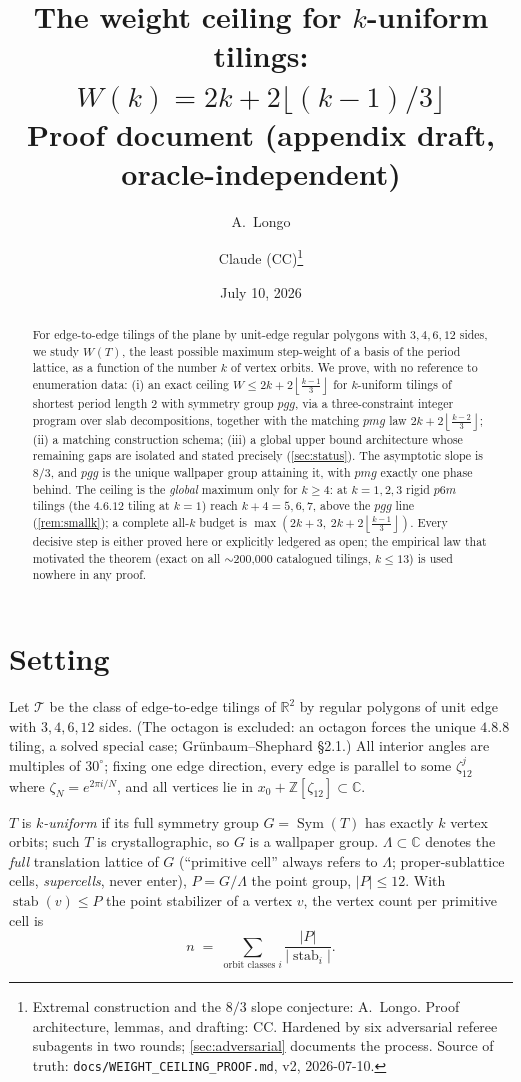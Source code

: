 \documentclass[11pt,a4paper,oneside]{article}
\title{The weight ceiling for $k$-uniform tilings:\\
$W(k) = 2k + 2\lfloor (k-1)/3\rfloor$\\[1ex]
\large Proof document (appendix draft, oracle-independent)}
\author{A.~Longo \and Claude (CC)\thanks{Extremal construction and the $8/3$ slope
conjecture: A.~Longo. Proof architecture, lemmas, and drafting: CC. Hardened by six
adversarial referee subagents in two rounds; \cref{sec:adversarial} documents the process.
Source of truth: \texttt{docs/WEIGHT\_CEILING\_PROOF.md}, v2, 2026-07-10.}}
\date{July 10, 2026}
\theoremstyle{plain}
\theoremstyle{definition}
\theoremstyle{remark}
\DeclareMathOperator{\stab}{stab}
\DeclareMathOperator{\Sym}{Sym}
\newcommand{\ZZ}{\mathbb{Z}}
\newcommand{\RR}{\mathbb{R}}
\newcommand{\CC}{\mathbb{C}}
\newcommand{\Tcl}{\mathcal{T}}
\newcommand{\zt}[1]{\zeta_{#1}}
\newcommand{\fl}[1]{\left\lfloor #1 \right\rfloor}
\newcommand{\ceilw}{2k + 2\fl{\tfrac{k-1}{3}}}
\newcommand{\pmgw}{2k + 2\fl{\tfrac{k-2}{3}}}
\begin{document}
\maketitle

\begin{abstract}
\noindent For edge-to-edge tilings of the plane by unit-edge regular polygons with
$3,4,6,12$ sides, we study $W(T)$, the least possible maximum step-weight of a basis of the
period lattice, as a function of the number $k$ of vertex orbits. We prove, with no
reference to enumeration data: (i) an exact ceiling $W \le \ceilw$ for $k$-uniform tilings
of shortest period length $2$ with symmetry group $pgg$, via a three-constraint integer
program over slab decompositions, together with the matching $pmg$ law $\pmgw$; (ii) a
matching construction schema; (iii) a global upper bound architecture whose remaining gaps
are isolated and stated precisely (\cref{sec:status}). The asymptotic slope is $8/3$, and
$pgg$ is the unique wallpaper group attaining it, with $pmg$ exactly one phase behind. The
ceiling is the \emph{global} maximum only for $k \ge 4$: at $k = 1, 2, 3$ rigid $p6m$
tilings (the $4.6.12$ tiling at $k=1$) reach $k + 4 = 5, 6, 7$, above the $pgg$ line
(\cref{rem:smallk}); a complete all-$k$ budget is $\max(2k+3,\ \ceilw)$. Every decisive
step is either proved here or explicitly ledgered as open; the empirical law that motivated
the theorem (exact on all $\sim$200{,}000 catalogued tilings, $k\le 13$) is used nowhere in
any proof.
\end{abstract}

\section{Setting}\label{sec:setting}

Let $\Tcl$ be the class of edge-to-edge tilings of $\RR^2$ by regular polygons of unit edge
with $3,4,6,12$ sides. (The octagon is excluded: an octagon forces the unique $4.8.8$
tiling, a solved special case; Gr\"unbaum--Shephard \S2.1.) All interior angles are
multiples of $30^\circ$; fixing one edge direction, every edge is parallel to some
$\zt{12}^j$ where $\zt{N} = e^{2\pi i/N}$, and all vertices lie in $x_0 + \ZZ[\zt{12}]
\subset \CC$.

$T$ is \emph{$k$-uniform} if its full symmetry group $G = \Sym(T)$ has exactly $k$ vertex
orbits; such $T$ is crystallographic, so $G$ is a wallpaper group. $\Lambda \subset \CC$
denotes the \emph{full} translation lattice of $G$ (``primitive cell'' always refers to
$\Lambda$; proper-sublattice cells, \emph{supercells}, never enter), $P = G/\Lambda$ the
point group, $|P| \le 12$. With $\stab(v) \le P$ the point stabilizer of a vertex $v$, the
vertex count per primitive cell is
\begin{equation}\label{eq:orbitcount}
n \;=\; \sum_{\text{orbit classes } i} \frac{|P|}{|\stab_i|}.
\end{equation}
\end{document}
